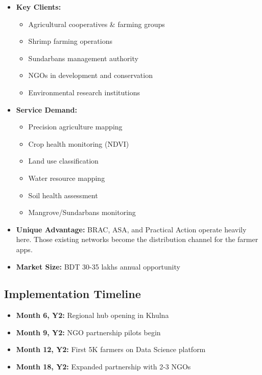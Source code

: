 \begin{itemize}
    \item \textbf{Key Clients:}
    \begin{itemize}
        \item Agricultural cooperatives \& farming groups
        \item Shrimp farming operations
        \item Sundarbans management authority
        \item NGOs in development and conservation
        \item Environmental research institutions
    \end{itemize}

    \item \textbf{Service Demand:}
    \begin{itemize}
        \item Precision agriculture mapping
        \item Crop health monitoring (NDVI)
        \item Land use classification
        \item Water resource mapping
        \item Soil health assessment
        \item Mangrove/Sundarbans monitoring
    \end{itemize}

    \item \textbf{Unique Advantage:} BRAC, ASA, and Practical Action operate heavily here. Those existing networks become the distribution channel for the farmer apps.

    \item \textbf{Market Size:} BDT 30-35 lakhs annual opportunity
\end{itemize}

\subsection{Implementation Timeline}

\begin{itemize}
    \item \textbf{Month 6, Y2:} Regional hub opening in Khulna
    \item \textbf{Month 9, Y2:} NGO partnership pilots begin
    \item \textbf{Month 12, Y2:} First 5K farmers on Data Science platform
    \item \textbf{Month 18, Y2:} Expanded partnership with 2-3 NGOs
\end{itemize}

